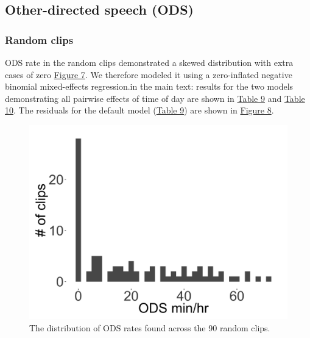 \documentclass[floatsintext,man]{apa6}
\theoremstyle{definition}
\theoremstyle{definition}
\theoremstyle{definition}
\theoremstyle{remark}
\begin{document}
\FloatBarrier

\subsection{Other-directed speech (ODS)}\label{models-ods}

\subsubsection{Random clips}\label{models-ods-random}

ODS rate in the random clips demonstrated a skewed distribution with
extra cases of zero \protect\hyperlink{fig7}{Figure 7}. We therefore
modeled it using a zero-inflated negative binomial mixed-effects
regression.in the main text: results for the two models demonstrating
all pairwise effects of time of day are shown in
\protect\hyperlink{tab9}{Table 9} and \protect\hyperlink{tab10}{Table
10}. The residuals for the default model (\protect\hyperlink{tab9}{Table
9}) are shown in \protect\hyperlink{fig8}{Figure 8}.

\FloatBarrier

\begin{figure}[H]

{\centering \includegraphics[width=0.4\linewidth]{www/ODS_random_distribution} 

}

\caption{The distribution of ODS rates found across the 90 random clips.}\label{fig:fig7}
\end{figure}

\FloatBarrier
\end{document}
